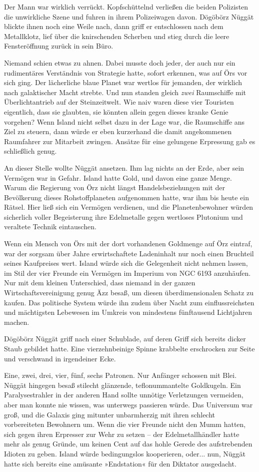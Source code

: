 Der Mann war wirklich verrückt. Kopfschüttelnd verließen die beiden Polizisten die unwirkliche Szene und fuhren in ihrem Polizeiwagen davon. Dögöbörz Nüggät blickte ihnen noch eine Weile nach, dann griff er entschlossen nach dem Metallklotz, lief über die knirschenden Scherben und stieg durch die leere Fensteröffnung zurück in sein Büro.

Niemand schien etwas zu ahnen. Dabei musste doch jeder, der auch nur ein rudimentäres Verständnis von Strategie hatte, sofort erkennen, was auf Örs vor sich ging. Der lächerliche blaue Planet war wertlos für jemanden, der wirklich nach galaktischer Macht strebte. Und nun standen gleich \emph{zwei} Raumschiffe mit Überlichtantrieb auf der Steinzeitwelt. Wie naiv waren diese vier Touristen eigentlich, dass sie glaubten, sie könnten allein gegen dieses kranke Genie vorgehen? Wenn Island nicht selbst dazu in der Lage war, die Raumschiffe ans Ziel zu steuern, dann würde er eben kurzerhand die damit angekommenen Raumfahrer zur Mitarbeit zwingen. Ansätze für eine gelungene Erpressung gab es schließlich genug.

An dieser Stelle wollte Nüggät ansetzen. Ihm lag nichts an der Erde, aber sein Vermögen war in Gefahr. Island hatte Gold, und davon eine ganze Menge. Warum die Regierung von Örz nicht längst Handelsbeziehungen mit der Bevölkerung dieses Rohstoffplaneten aufgenommen hatte, war ihm bis heute ein Rätsel. Hier ließ sich ein Vermögen verdienen, und die Planetenbewohner würden sicherlich voller Begeisterung ihre Edelmetalle gegen wertloses Plutonium und veraltete Technik eintauschen.

Wenn ein Mensch von Örs mit der dort vorhandenen Goldmenge auf Örz eintraf, war der sorgsam über Jahre erwirtschaftete Ladeninhalt nur noch einen Bruchteil seines Kaufpreises wert. Island würde sich die Gelegenheit nicht nehmen lassen, im Stil der vier Freunde ein Vermögen im Imperium von NGC 6193 anzuhäufen. Nur mit dem kleinen Unterschied, dass niemand in der ganzen Wirtschaftsvereinigung genug Äzz besaß, um diesen überdimensionalen Schatz zu kaufen. Das politische System würde ihn zudem über Nacht zum einflussreichsten und mächtigsten Lebewesen im Umkreis von mindestens fünftausend Lichtjahren machen.

Dögöbörz Nüggät griff nach einer Schublade, auf deren Griff sich bereits dicker Staub gebildet hatte. Eine vierzehnbeinige Spinne krabbelte erschrocken zur Seite und verschwand in irgendeiner Ecke.

Eine, zwei, drei, vier, fünf, sechs Patronen. Nur Anfänger schossen mit Blei. Nüggät hingegen besaß stilecht glänzende, teflonummantelte Goldkugeln. Ein Paralysestrahler in der anderen Hand sollte unnötige Verletzungen vermeiden, aber man konnte nie wissen, was unterwegs passieren würde. Das Universum war groß, und die Galaxis ging mitunter unbarmherzig mit ihren schlecht vorbereiteten Bewohnern um. Wenn die vier Freunde nicht den Mumm hatten, sich gegen ihren Erpresser zur Wehr zu setzen – der Edelmetallhändler hatte mehr als genug Gründe, um keinen Cent auf das hohle Gerede des aufstrebenden Idioten zu geben. Island würde bedingungslos kooperieren, oder... nun, Nüggät hatte sich bereits eine amüsante »Endstation« für den Diktator ausgedacht.

